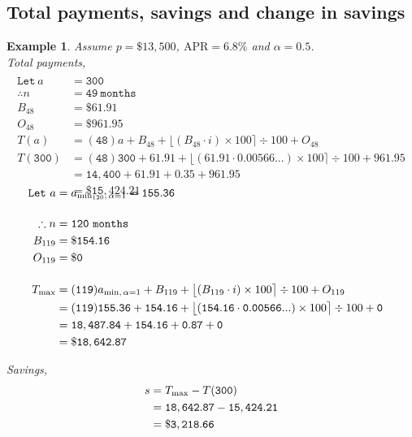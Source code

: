 \documentclass[12pt,letterpaper,oneside]{article}
\newtheorem{example}{Example}[section]
\theoremstyle{remark} %
\begin{document}
	\newpage
	\subsection{Total payments, savings and change in savings}
	\setcounter{example}{0} %
	\begin{example}
	Assume $p=\$13,500$, $\mbox{APR}=6.8\%$ and $\alpha=0.5$.\\[12pt]
	Total payments,
	\begin{align*}
	\\\mathtt{Let\ } a&=\mathtt{300}\\[12pt]
	\therefore n&=\mathtt{49\ months}\\
	B_{48}&=\mathtt{\$61.91}\\
	O_{48}&=\mathtt{\$961.95}\\[12pt]
	T(a)&=(\mathtt{48}) a+B_{48}+\big\lfloor{\left(B_{48}\cdot i\right)\times 100}\big\rceil\div 100+O_{48}\\
	T(\mathtt{300})&=(\mathtt{48}) \mathtt{300}+\mathtt{61.91}+\big\lfloor{\left(\mathtt{61.91}\cdot \mathtt{0.00566...}\right)\times 100}\big\rceil\div 100+\mathtt{961.95}\\
	&=\mathtt{14,400}+\mathtt{61.91}+\mathtt{0.35}+\mathtt{961.95}\\
	&=\mathtt{\$15,424.21}
	\end{align*}

	\label{amina}
	\begin{align*}\\[-36pt]
	\mathtt{Let\ } a&=a_{\rm{min_{120},\,\alpha=1}}=\mathtt{155.36}\\[12pt]
	\therefore n&=\mathtt{120\ months}\\
	B_{119}&=\mathtt{\$154.16}\\
	O_{119}&=\mathtt{\$0}\\[12pt]	
	T_{\rm{max}}&=(\mathtt{119}) a_{\rm{min},\,\alpha=1}+B_{119}+\big\lfloor{\left(B_{119}\cdot i\right)\times 100}\big\rceil\div 100+O_{119}\\
	&=(\mathtt{119}) \mathtt{155.36}+\mathtt{154.16}+\big\lfloor{\left(\mathtt{154.16}\cdot \mathtt{0.00566...}\right)\times 100}\big\rceil\div 100+\mathtt{0}\\
	&=\mathtt{18,487.84}+\mathtt{154.16}+\mathtt{0.87}+\mathtt{0}\\
	&=\mathtt{\$18,642.87}
	\end{align*}

	\vspace{12pt}
	Savings,
	\begin{align*}
	s&=T_{\rm{max}}-T(\mathtt{300})\\
	&=\mathtt{18,642.87}-\mathtt{15,424.21}\\
	&=\mathtt{\$3,218.66}
	\end{align*}


\end{example}
\end{document}
